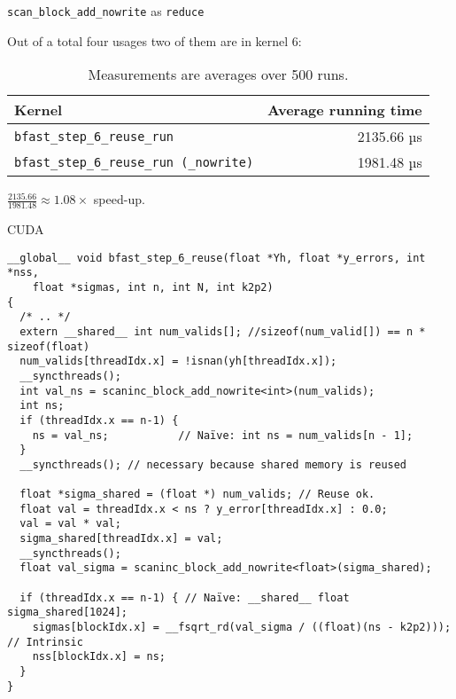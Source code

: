 \begin{frame}[fragile]{\texttt{scan\_block\_add\_nowrite} as \texttt{reduce}}

    Out of a total four usages two of them are in kernel 6:

    \begin{table}
        \centering
        \begin{tabular}{l r}
            
          \footnotesize  \textbf{Kernel} & \textbf{Average running time} \\ \hline
           \footnotesize \texttt{bfast\_step\_6\_reuse\_run} &     2135.66 µs \\
          \footnotesize  \texttt{bfast\_step\_6\_reuse\_run (\_nowrite)} & 1981.48 µs
        \end{tabular}
        \caption{Measurements are averages over 500 runs.}
        \label{tab:nowrite}
    \end{table}

\(\frac{2135.66}{1981.48}  \approx 1.08 \times \) speed-up.

\end{frame}


\begin{frame}[fragile]{CUDA}

\begin{verbatim}
__global__ void bfast_step_6_reuse(float *Yh, float *y_errors, int *nss,
    float *sigmas, int n, int N, int k2p2)
{
  /* .. */
  extern __shared__ int num_valids[]; //sizeof(num_valid[]) == n * sizeof(float)
  num_valids[threadIdx.x] = !isnan(yh[threadIdx.x]);
  __syncthreads();
  int val_ns = scaninc_block_add_nowrite<int>(num_valids);
  int ns;
  if (threadIdx.x == n-1) {
    ns = val_ns;           // Naïve: int ns = num_valids[n - 1];
  }
  __syncthreads(); // necessary because shared memory is reused

  float *sigma_shared = (float *) num_valids; // Reuse ok.
  float val = threadIdx.x < ns ? y_error[threadIdx.x] : 0.0;
  val = val * val;
  sigma_shared[threadIdx.x] = val;
  __syncthreads();
  float val_sigma = scaninc_block_add_nowrite<float>(sigma_shared);

  if (threadIdx.x == n-1) { // Naïve: __shared__ float sigma_shared[1024];
    sigmas[blockIdx.x] = __fsqrt_rd(val_sigma / ((float)(ns - k2p2))); // Intrinsic
    nss[blockIdx.x] = ns;
  }
}
\end{verbatim}
\end{frame}

